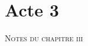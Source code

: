 
\chapter{Acte 3}


\ifdefined\AVECNOTES
  \cleardoublepage
  {\centering\normalfont\scshape\large Notes du chapitre \textsc{iii}\par}
  \vspace{\onelineskip}
  \begingroup\parindent=0pt
  \theendnotes
  \endgroup
\fi

  \theendnotes

